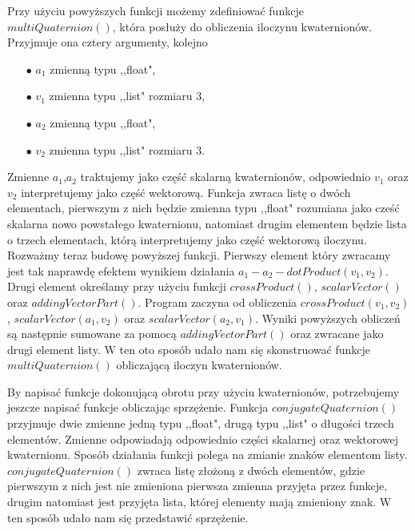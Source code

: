 \documentclass[a4paper,twoside,11pt,reqno]{mwrep}
\theoremstyle{plain} \newtheorem{twr}{Twierdzenie}
\theoremstyle{plain} \newtheorem{lem}{Lemat}
\theoremstyle{definition} \newtheorem{defi}{Definicja}
\theoremstyle{remark} \newtheorem*{wni}{Wniosek}
\theoremstyle{definition} \newtheorem{uwaga}{Uwaga}
\theoremstyle{definition}\newtheorem{prz}{Przykład}
\begin{document}
Przy użyciu powyższych funkcji możemy zdefiniować funkcje $multiQuaternion()$, która posłuży 
do obliczenia iloczynu kwaternionów. Przyjmuje ona cztery argumenty, kolejno 
\begin{itemize}
\item[$\bullet$] $a_1$ zmienną typu ,,float",
\item[$\bullet$] $v_1$ zmienna typu ,,list" rozmiaru $3$,
\item[$\bullet$] $a_2$ zmienną typu ,,float",
\item[$\bullet$] $v_2$ zmienna typu ,,list" rozmiaru $3$.
\end{itemize} 
Zmienne $a_1$,$a_2$ traktujemy jako część skalarną kwaternionów, odpowiednio $v_1$ oraz $v_2$ interpretujemy
jako część wektorową. Funkcja zwraca listę o dwóch elementach, pierwszym z nich będzie
zmienna typu ,,float" rozumiana jako 
cześć skalarna nowo powstałego kwaternionu, natomiast drugim elementem będzie lista o trzech elementach,
którą interpretujemy jako część wektorową iloczynu.
Rozważmy teraz budowę powyższej funkcji. Pierwszy element który zwracamy jest tak naprawdę efektem
wynikiem działania $a_1-a_2 - dotProduct(v_1,v_2)$. Drugi element określamy przy użyciu funkcji
$crossProduct()$, $scalarVector()$ oraz $addingVectorPart()$.
Program zaczyna od obliczenia $crossProduct(v_1,v_2)$, $scalarVector(a_1,v_2)$ oraz $scalarVector(a_2,v_1)$.
Wyniki powyższych obliczeń są następnie sumowane za pomocą $addingVectorPart()$ oraz zwracane jako drugi
element listy. W ten oto sposób udało nam się skonstruować funkcje $multiQuaternion()$
obliczającą iloczyn kwaternionów.

By napisać funkcje dokonującą obrotu przy użyciu kwaternionów, potrzebujemy jeszcze napisać funkcje obliczając
sprzężenie. Funkcja $conjugateQuaternion()$ przyjmuje dwie zmienne jedną typu ,,float", drugą typu ,,list"
o długości trzech elementów. Zmienne odpowiadają odpowiednio części skalarnej oraz wektorowej kwaternionu.
Sposób działania funkcji polega na zmianie znaków elementom listy. $conjugateQuaternion()$ zwraca
listę złożoną z dwóch elementów, gdzie pierwszym z nich jest nie zmieniona pierwsza zmienna przyjęta 
przez funkcje, drugim natomiast jest przyjęta lista, której elementy mają zmieniony znak. W ten sposób
udało nam się przedstawić sprzężenie.
\end{document}

